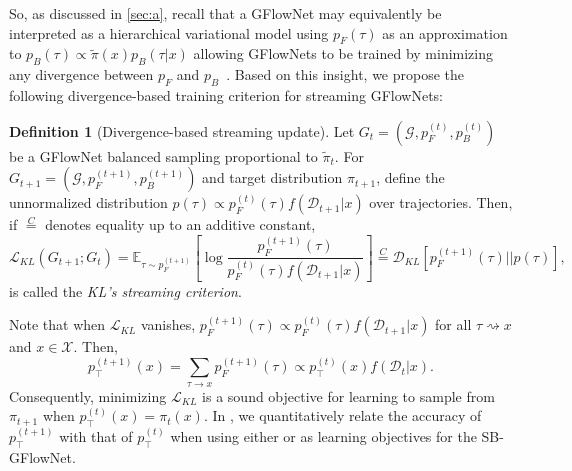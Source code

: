\documentclass{article}
\theoremstyle{plain}
\theoremstyle{definition}
\newtheorem{definition}{Definition}
\theoremstyle{remark}
\theoremstyle{remark}
\begin{document}
So, as discussed in \autoref{sec:a}, recall that a GFlowNet may equivalently be interpreted as a hierarchical variational model using $p_{F}(\tau)$ as an approximation to $p_{B}(\tau) \propto \tilde{\pi}(x) p_{B}(\tau | x)$ allowing GFlowNets to be trained by minimizing any divergence between $p_{F}$ and $p_{B}$~\citep{malkin2023gflownets}. Based on this insight, we propose the following divergence-based training criterion for streaming GFlowNets:

\begin{definition}[Divergence-based streaming update]\label{def:klupd}
    Let $G_{t} = (\mathcal{G}, p_{F}^{(t)}, p_{B}^{(t)})$ be a GFlowNet balanced sampling proportional to $\tilde{\pi}_{t}$. For $G_{t + 1} = (\mathcal{G}, p_{F}^{(t + 1)}, p_{B}^{(t + 1)})$ and target distribution $\pi_{t + 1}$, define the unnormalized distribution $p(\tau) \propto p_{F}^{(t)}(\tau) f(\mathcal{D}_{t + 1} | x)$ over trajectories. Then, if $\overset{C}{=}$ denotes equality up to an additive constant, 
    \begin{equation} \label{eq:vaa} 
        \mathcal{L}_{KL}(G_{t+1} ; G_{t})
        = \mathbb{E}_{\tau \sim p_{F}^{(t + 1)}} \left[ \log \frac{p_{F}^{(t + 1)}(\tau)}{p_{F}^{(t)}(\tau) f(\mathcal{D}_{t+1}|x) }\right]
        \overset{C}{=} \mathcal{D}_{KL} \left[ p_{F}^{(t + 1)}(\tau) || p(\tau) \right], 
    \end{equation}
    is called the \emph{KL's streaming criterion}.  
\end{definition}

Note that when $\mathcal{L}_{KL}$ vanishes, $p_{F}^{(t + 1)}(\tau) \propto p_{F}^{(t)}(\tau) f(\mathcal{D}_{t+1}|x)$ for all $\tau \rightsquigarrow x$ and $x \in \mathcal{X}$. Then,
\[p_{\top}^{(t + 1)}(x) = \sum_{\tau \rightarrow x} p_{F}^{(t + 1)}(\tau) \propto p_{\top}^{(t)}(x) f(\mathcal{D}_{t} | x).\] Consequently, minimizing $\mathcal{L}_{KL}$ is a sound objective for learning to sample from $\pi_{t + 1}$ when $p_{\top}^{(t)}(x) = \pi_{t}(x)$. In , we quantitatively relate the accuracy of $p_{\top}^{(t + 1)}$ with that of $p_{\top}^{(t)}$ when using either  or  as learning objectives for the SB-GFlowNet.     
\end{document}
